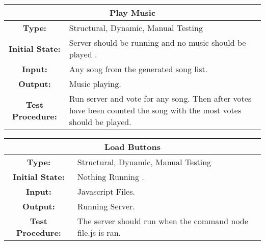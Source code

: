 \documentclass[12pt, titlepage]{article}
\begin{document}
\begin{center}
\begin{table}[H]
\begin{tabularx}{\textwidth}{| c X |}
\hline
\multicolumn{2}{|c|}{\textbf{Play Music}}\\
\hline
\textbf{Type: } & Structural, Dynamic, Manual Testing\\

\textbf{Initial State: } & Server should be running and no music should be played .\\

\textbf{Input: } & Any song from the generated song list.\\

\textbf{Output: } & Music playing.\\

\textbf{Test Procedure: } & Run server and vote for any song. Then after votes have been counted the song with the most votes should be played. \\
\hline
\end{tabularx}
\end{table}
\end{center}
\begin{center}
\begin{table}[H]
\begin{tabularx}{\textwidth}{| c X |}
\hline
\multicolumn{2}{|c|}{\textbf{Load Buttons}}\\
\hline
\textbf{Type: } & Structural, Dynamic, Manual Testing\\

\textbf{Initial State: } & Nothing Running .\\

\textbf{Input: } & Javascript Files.\\

\textbf{Output: } & Running Server.\\

\textbf{Test Procedure: } & The server should run when the command node file.js is ran. \\
\hline
\end{tabularx}
\end{table}
\end{center}
\end{document}
